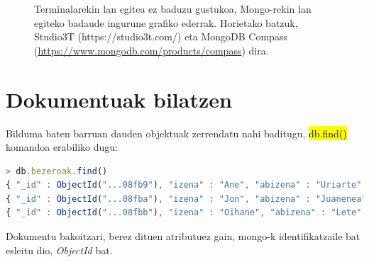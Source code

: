 \begin{figure}[ht]
	\centering
{}
\caption{Terminalarekin lan egitea ez baduzu gustukoa, Mongo-rekin lan egiteko badaude ingurune grafiko ederrak. Horietako batzuk, Studio3T (https://studio3t.com/) eta MongoDB Compass (\href{https://www.mongodb.com/products/compass}{https://www.mongodb.com/products/compass}) dira.}
\label{fig:mongo-insert}
\end{figure}

\section{Dokumentuak bilatzen}
Bilduma baten barruan dauden objektuak zerrendatu nahi baditugu, \hl{db.find()} komandoa erabiliko dugu:

\begin{lstlisting}[language=JavaScript, numbers=none]
> db.bezeroak.find()
{ "_id" : ObjectId("...08fb9"), "izena" : "Ane", "abizena" : "Uriarte", "email" : "ane@ni.eus" }
{ "_id" : ObjectId("...08fba"), "izena" : "Jon", "abizena" : "Juanenea", "email" : "jon@ni.eus" }
{ "_id" : ObjectId("...08fbb"), "izena" : "Oihane", "abizena" : "Lete", "email" : "oihane@ni.eus" }
\end{lstlisting}

Dokumentu bakoitzari, berez dituen atributuez gain, mongo-k identifikatzaile bat esleitu dio, \textit{ObjectId} bat. 


